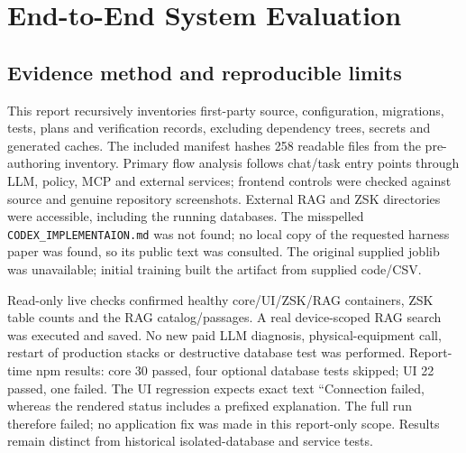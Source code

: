 \chapter{End-to-End System Evaluation}
\section{Evidence method and reproducible limits}
This report recursively inventories first-party source, configuration, migrations, tests, plans and verification records, excluding dependency trees, secrets and generated caches. The included manifest hashes 258 readable files from the pre-authoring inventory. Primary flow analysis follows chat/task entry points through LLM, policy, MCP and external services; frontend controls were checked against source and genuine repository screenshots. External RAG and ZSK directories were accessible, including the running databases. The misspelled \texttt{CODEX\_IMPLEMENTAION.md} was not found; no local copy of the requested harness paper was found, so its public text was consulted. The original supplied joblib was unavailable; initial training built the artifact from supplied code/CSV.

Read-only live checks confirmed healthy core/UI/ZSK/RAG containers, ZSK table counts and the RAG catalog/passages. A real device-scoped RAG search was executed and saved. No new paid LLM diagnosis, physical-equipment call, restart of production stacks or destructive database test was performed. Report-time npm results: core 30 passed, four optional database tests skipped; UI 22 passed, one failed. The UI regression expects exact text ``Connection failed, whereas the rendered status includes a prefixed explanation. The full run therefore failed; no application fix was made in this report-only scope. Results remain distinct from historical isolated-database and service tests.
